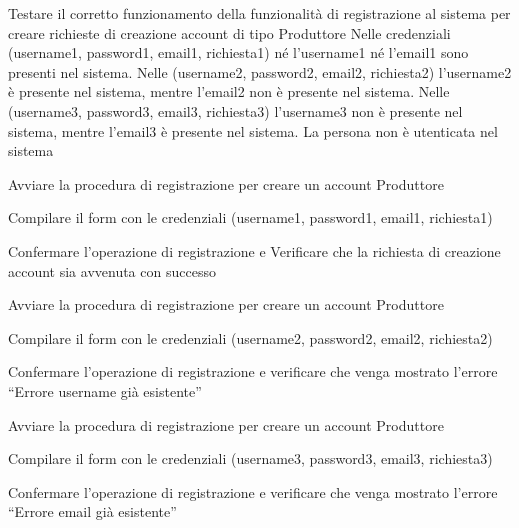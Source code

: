 {Testare il corretto funzionamento della funzionalità di registrazione al sistema per creare richieste di creazione account di tipo Produttore}
{Nelle credenziali (username1, password1, email1, richiesta1) né l'username1 né l'email1 sono presenti nel sistema. Nelle (username2, password2, email2, richiesta2) l'username2 è presente nel sistema, mentre l'email2 non è presente nel sistema. Nelle (username3, password3, email3, richiesta3) l'username3 non è presente nel sistema, mentre l'email3 è presente nel sistema. La persona non è utenticata nel sistema}
{\begin{enumCU}
	\item Avviare la procedura di registrazione per creare un account Produttore
	\item Compilare il form con le credenziali (username1, password1, email1, richiesta1)
	\item Confermare l'operazione di registrazione e Verificare che la richiesta di creazione account sia avvenuta con successo
	\item Avviare la procedura di registrazione per creare un account Produttore
	\item Compilare il form con le credenziali (username2, password2, email2, richiesta2)
	\item Confermare l'operazione di registrazione e verificare che venga mostrato l'errore ``Errore username già esistente''
	\item Avviare la procedura di registrazione per creare un account Produttore
	\item Compilare il form con le credenziali (username3, password3, email3, richiesta3)
	\item Confermare l'operazione di registrazione e verificare che venga mostrato l'errore ``Errore email già esistente''
\end{enumCU}}


